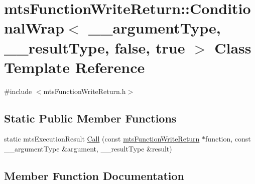 \hypertarget{classmts_function_write_return_1_1_conditional_wrap_3_01____argument_type_00_01____result_type_00_01false_00_01true_01_4}{}\section{mts\+Function\+Write\+Return\+:\+:Conditional\+Wrap$<$ \+\_\+\+\_\+argument\+Type, \+\_\+\+\_\+result\+Type, false, true $>$ Class Template Reference}
\label{classmts_function_write_return_1_1_conditional_wrap_3_01____argument_type_00_01____result_type_00_01false_00_01true_01_4}


{\ttfamily \#include $<$mts\+Function\+Write\+Return.\+h$>$}

\subsection*{Static Public Member Functions}
\begin{DoxyCompactItemize}
\item 
static mts\+Execution\+Result \hyperlink{classmts_function_write_return_1_1_conditional_wrap_3_01____argument_type_00_01____result_type_00_01false_00_01true_01_4_a764b0f30f553f16aac7f0c16c2022f9f}{Call} (const \hyperlink{classmts_function_write_return}{mts\+Function\+Write\+Return} $\ast$function, const \+\_\+\+\_\+argument\+Type \&argument, \+\_\+\+\_\+result\+Type \&result)
\end{DoxyCompactItemize}


\subsection{Member Function Documentation}
\hypertarget{classmts_function_write_return_1_1_conditional_wrap_3_01____argument_type_00_01____result_type_00_01false_00_01true_01_4_a764b0f30f553f16aac7f0c16c2022f9f}{}
